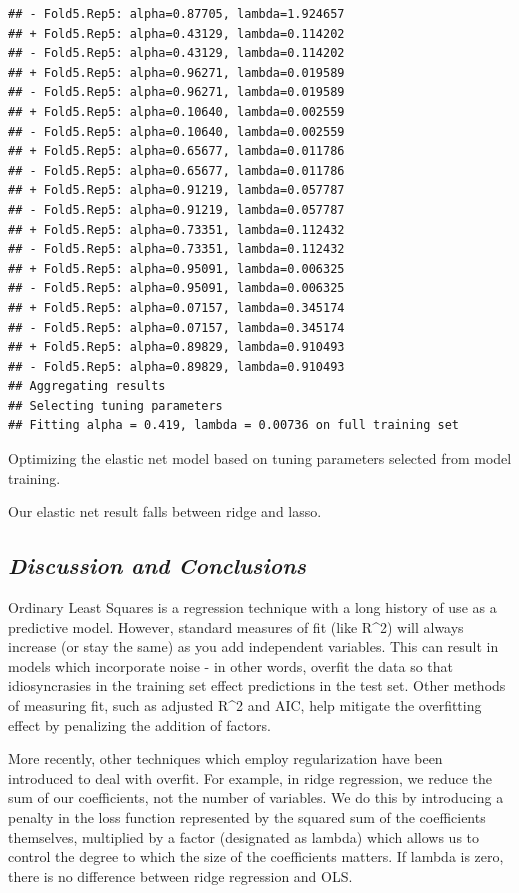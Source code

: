\documentclass[
]{article}
\begin{document}
\begin{verbatim}
## - Fold5.Rep5: alpha=0.87705, lambda=1.924657 
## + Fold5.Rep5: alpha=0.43129, lambda=0.114202 
## - Fold5.Rep5: alpha=0.43129, lambda=0.114202 
## + Fold5.Rep5: alpha=0.96271, lambda=0.019589 
## - Fold5.Rep5: alpha=0.96271, lambda=0.019589 
## + Fold5.Rep5: alpha=0.10640, lambda=0.002559 
## - Fold5.Rep5: alpha=0.10640, lambda=0.002559 
## + Fold5.Rep5: alpha=0.65677, lambda=0.011786 
## - Fold5.Rep5: alpha=0.65677, lambda=0.011786 
## + Fold5.Rep5: alpha=0.91219, lambda=0.057787 
## - Fold5.Rep5: alpha=0.91219, lambda=0.057787 
## + Fold5.Rep5: alpha=0.73351, lambda=0.112432 
## - Fold5.Rep5: alpha=0.73351, lambda=0.112432 
## + Fold5.Rep5: alpha=0.95091, lambda=0.006325 
## - Fold5.Rep5: alpha=0.95091, lambda=0.006325 
## + Fold5.Rep5: alpha=0.07157, lambda=0.345174 
## - Fold5.Rep5: alpha=0.07157, lambda=0.345174 
## + Fold5.Rep5: alpha=0.89829, lambda=0.910493 
## - Fold5.Rep5: alpha=0.89829, lambda=0.910493 
## Aggregating results
## Selecting tuning parameters
## Fitting alpha = 0.419, lambda = 0.00736 on full training set
\end{verbatim}

Optimizing the elastic net model based on tuning parameters selected
from model training.

Our elastic net result falls between ridge and lasso.

\hypertarget{discussion-and-conclusions}{%
\subsection{\texorpdfstring{\emph{Discussion and
Conclusions}}{Discussion and Conclusions}}\label{discussion-and-conclusions}}

Ordinary Least Squares is a regression technique with a long history of
use as a predictive model. However, standard measures of fit (like
R\^{}2) will always increase (or stay the same) as you add independent
variables. This can result in models which incorporate noise - in other
words, overfit the data so that idiosyncrasies in the training set
effect predictions in the test set. Other methods of measuring fit, such
as adjusted R\^{}2 and AIC, help mitigate the overfitting effect by
penalizing the addition of factors.

More recently, other techniques which employ regularization have been
introduced to deal with overfit. For example, in ridge regression, we
reduce the sum of our coefficients, not the number of variables. We do
this by introducing a penalty in the loss function represented by the
squared sum of the coefficients themselves, multiplied by a factor
(designated as lambda) which allows us to control the degree to which
the size of the coefficients matters. If lambda is zero, there is no
difference between ridge regression and OLS.
\end{document}
